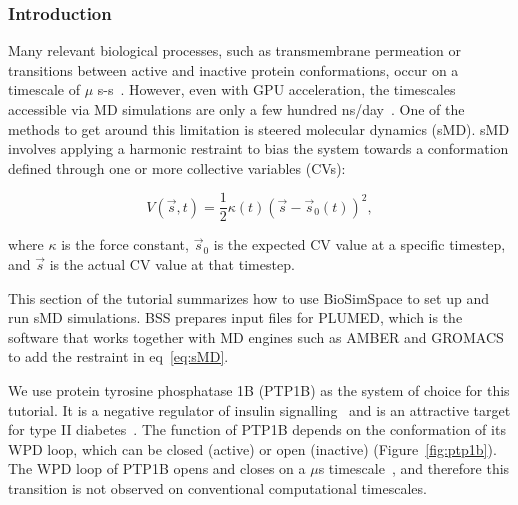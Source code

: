 \subsubsection{Introduction}
Many relevant biological processes, such as transmembrane permeation or transitions between active and inactive protein conformations, occur on a timescale of $\mu$ s-s~\cite{Zwier2010,Choy2017,Wells2007}. However, even with GPU acceleration, the timescales accessible via MD simulations are only a few hundred ns/day~\cite{HecBioSim_benchmark}. One of the methods to get around this limitation is steered molecular dynamics (sMD). sMD involves applying a harmonic restraint to bias the system towards a conformation defined through one or more collective variables (CVs):

\begin{equation}
V(\vec{s},t) = \frac{1}{2} \kappa(t) ( \vec{s} - \vec{s}_0(t) )^2,
\label{eq:sMD}
\end{equation}

where $\kappa$ is the force constant, $\vec{s}_0$ is the expected CV value at a specific timestep, and $\vec{s}$ is the actual CV value at that timestep\cite{Isralewitz2001,Tribello2014}.

This section of the tutorial summarizes how to use BioSimSpace to set up and run sMD simulations. BSS prepares input files for PLUMED, which is the software that works together with MD engines such as AMBER and GROMACS to add the restraint in eq~\ref{eq:sMD}.

We use protein tyrosine phosphatase 1B (PTP1B) as the system of choice for this tutorial. It is a negative regulator of insulin signalling~\cite{sMD_ptp1b-diabetes} and is an attractive target for type II diabetes~\cite{sMD_Wiesman}. The function of PTP1B depends on the conformation of its WPD loop, which can be closed (active) or open (inactive) (Figure~\ref{fig:ptp1b}). The WPD loop of PTP1B opens and closes on a $\mu$s timescale~\cite{Choy2017}, and therefore this transition is not observed on conventional computational timescales.

